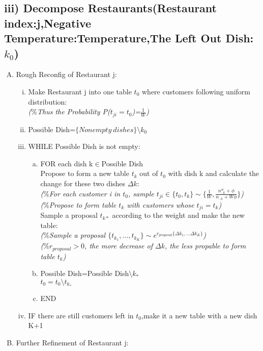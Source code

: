 \documentclass{article}
\begin{document}
\begin{spacing}{1.1}
\subsection{iii) Decompose Restaurants(Restaurant index:j,Negative Temperature:Temperature,The Left Out Dish: $k_{0}$)}
\begin{enumerate}[(A)]
\item Rough Reconfig of Restaurant j:
\begin{enumerate}[(i)]
\item Make Restaurant j into one table $t_{0}$ where customers following uniform distribution:\\
\small{\emph{($\%$Thus the Probability P($t_{ji}=t_{0}$)=$\frac{1}{W}$)}}
\item Possible Dish=$\{Nonempty \ dishes\}\setminus k_{0}$
\item WHILE Possible Dish is not empty:
\begin{enumerate}[(a)]
\item FOR each dish k$\in$Possible Dish\\
Propose to form a new table $t_{k}$ out of $t_{0}$ with dish k and calculate {the change for these two dishes} $\Delta k$:\\
\small{\emph{($\%$For each customer i in $t_{0}$, sample $t_{ji}\in\{t_{0},t_{k}\}\sim\{\frac{1}{W},\frac{n_{..k}^{w}+\phi}{n_{..k}+W\phi}\}$)}}\\
\small{\emph{($\%$Propose to form table $t_{k}$ with customers whose $t_{ji}=t_{k}$)}}\\
Sample a proposal $t_{k*}$ according to the weight and make the new table:\\
\small{\emph{($\%$Sample a proposal $\{t_{k_{1}},...,t_{k_{K}}\}\sim e^{r_{proposal}\{\Delta k_{1},...\Delta k_{K}\}}$)}}\\
\small{\emph{($\%r_{proposal}>0$, the more decrease of $\Delta k$, the less propable to form table $t_{k}$)}}
\item Possible Dish=Possible Dish$\setminus k_{*}$\\
$t_{0}=t_{0} \setminus t_{k_{*}}$
\item END
\end{enumerate}
\item IF there are still customers left in $t_{0}$,make it a new table with a new dish K+1
\end{enumerate}
\item Further Refinement of Restaurant j:\\
\begin{enumerate}[(i)]

\end{enumerate}
\end{enumerate}
\end{spacing}
\end{document}
